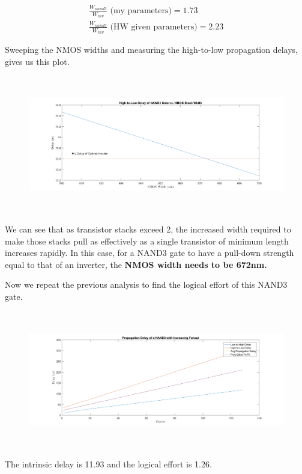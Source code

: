 \documentclass[11pt]{article}
\begin{document}
\begin{eqnarray}
\frac{W_{nand3}}{W_{inv}} \text{ (my parameters)} = 1.73 \nonumber \\
\frac{W_{nand3}}{W_{inv}} \text{ (HW given parameters)} = 2.23 \nonumber
\end{eqnarray}

Sweeping the NMOS widths and measuring the high-to-low propagation delays, gives us this plot.

\begin{figure}[H]
	\centerline{\includegraphics[height=6cm]{images/nand3_delay_vs_width.png}}
\end{figure}

We can see that as transistor stacks exceed 2, the increased width required to make those stacks pull as effectively as a single transistor of minimum length increases rapidly. In this case, for a NAND3 gate to have a pull-down strength equal to that of an inverter, the \textbf{NMOS width needs to be 672nm.}

Now we repeat the previous analysis to find the logical effort of this NAND3 gate.

\begin{figure}[H]
	\centerline{\includegraphics[height=6cm]{images/nand3_delay_vs_fanout.png}}
\end{figure}

The intrinsic delay is 11.93 and the logical effort is 1.26.
\end{document}
